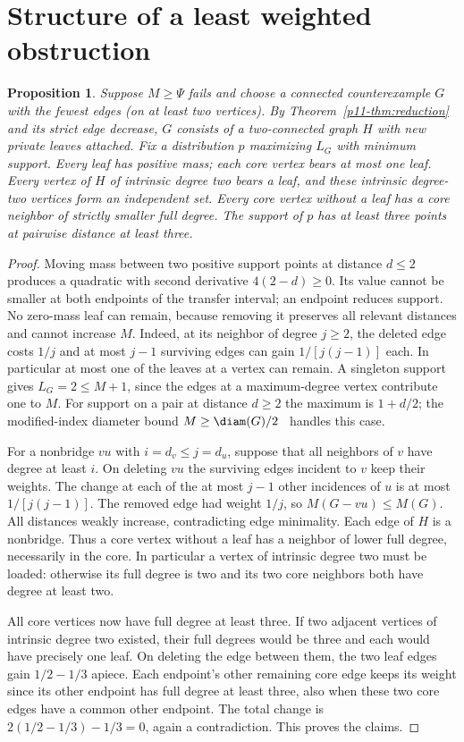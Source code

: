 \documentclass[11pt,a4paper]{article}
\newtheorem{proposition}[theorem]{Proposition}
\begin{document}
\section{Structure of a least weighted obstruction}
\begin{proposition}\label{p11-prop:weighted-obstruction}
Suppose $M\ge\Psi$ fails and choose a connected counterexample $G$
with the fewest edges (on at least two vertices). By Theorem~\ref{p11-thm:reduction} and its strict edge decrease, $G$ consists of a two-connected graph $H$ with new private leaves attached.
Fix a distribution $p$ maximizing $L_G$ with minimum support.
Every leaf has positive mass; each core vertex bears at most one leaf.
Every vertex of $H$ of intrinsic degree two bears a leaf, and these
intrinsic degree-two vertices form an independent set. Every core
vertex without a leaf has a core neighbor of strictly smaller full degree.
The support of $p$ has at least three points at pairwise distance at
least three.
\end{proposition}
\begin{proof}
Moving mass between two positive support points at distance $d\le2$
produces a quadratic with second derivative $4(2-d)\ge0$. Its value
cannot be smaller at both endpoints of the transfer interval; an
endpoint reduces support. No zero-mass leaf can remain, because removing
it preserves all relevant distances and cannot increase $M$. Indeed,
at its neighbor of degree $j\ge2$, the deleted edge costs $1/j$ and
at most $j-1$ surviving edges can gain $1/[j(j-1)]$ each.
In particular at most one of the leaves at a vertex can remain.
A singleton support gives $L_G=2\le M+1$, since the edges at a
maximum-degree vertex contribute one to $M$. For support on a pair at
distance $d\ge2$ the maximum is $1+d/2$; the modified-index diameter
bound $M\ge\diam(G)/2$~\cite[Theorem~3]{p11-DLS} handles this case.

For a nonbridge $vu$ with $i=d_v\le j=d_u$, suppose that all neighbors
of $v$ have degree at least $i$. On deleting $vu$ the surviving edges
incident to $v$ keep their weights. The change at each of the at most
$j-1$ other incidences of $u$ is at most $1/[j(j-1)]$. The removed
edge had weight $1/j$, so $M(G-vu)\le M(G)$. All distances weakly
increase, contradicting edge minimality. Each edge of $H$ is a
nonbridge. Thus a core vertex without a leaf has a neighbor of lower
full degree, necessarily in the core. In particular a vertex of
intrinsic degree two must be loaded: otherwise its full degree is two
and its two core neighbors both have degree at least two.

All core vertices now have full degree at least three. If two adjacent
vertices of intrinsic degree two existed, their full degrees would be
three and each would have precisely one leaf. On deleting the edge
between them, the two leaf edges gain $1/2-1/3$ apiece. Each endpoint's
other remaining core edge keeps its weight since its other endpoint
has full degree at least three, also when these two core edges have
a common other endpoint. The total change is $2(1/2-1/3)-1/3=0$,
again a contradiction. This proves the claims.
\end{proof}
\end{document}
